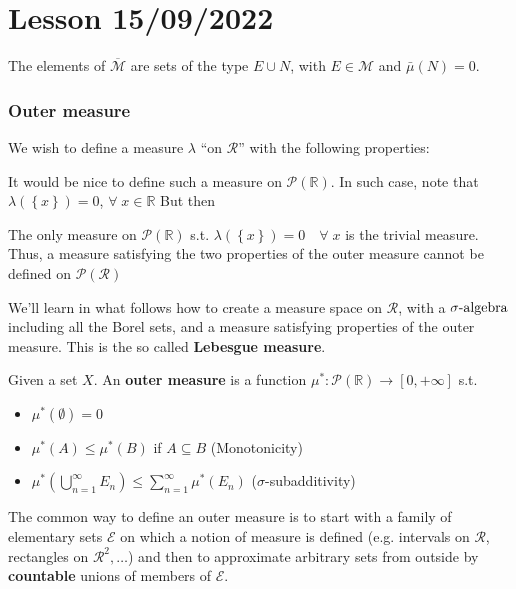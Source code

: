 \section{Lesson 15/09/2022}
The elements of \(\overline{\mathcal{M}}\) are sets of the type \(E \cup N\), with \(E \in \mathcal{M}\) and \(\bar{\mu}(N) = 0\).
\subsubsection*{Outer measure}
We wish to define a measure \(\lambda\) ``on \(\mathcal{R}\)'' with the following properties:
It would be nice to define such a measure on \(\mathcal{P}(\mathbb{R})\). In such case, note that \(\lambda(\left\lbrace x \right\rbrace) = 0\), \(\forall \; x \in \mathbb{R}\)
But then 
\begin{theorem}[Ulam]
    The only measure on \(\mathcal{P}(\mathbb{R})\) s.t. \(\lambda(\left\lbrace x \right\rbrace) = 0 \quad \forall \; x\) is the trivial measure. Thus, a measure satisfying the two properties of the outer measure cannot be defined on \(\mathcal{P}(\mathcal{R})\)
\end{theorem}
We'll learn in what follows how to create a measure space on \(\mathcal{R}\), with a \(\sigma\mbox{-algebra}\) including all the Borel sets, and a measure satisfying properties of the outer measure. This is the so called \textbf{Lebesgue measure}.
\begin{definition}
    Given a set \(X\). An \textbf{outer measure} is a function \(\mu^* : \mathcal{P}(\mathbb{R}) \to [0, +\infty]\) s.t. 
    \begin{itemize}
        \item \(\mu^*(\emptyset) = 0\)
        \item \(\mu^*(A) \leq \mu^*(B)\) if \(A \subseteq B\) (Monotonicity)
        \item \(\mu^*(\bigcup_{n=1}^{\infty} E_n) \leq \sum_{n=1}^{\infty} \mu^*(E_n)\) (\(\sigma\)-subadditivity)
    \end{itemize}
\end{definition}
The common way to define an outer measure is to start with a family of elementary sets \(\mathcal{E}\) on which a notion of measure is defined (e.g. intervals on \(\mathcal{R}\), rectangles on \(\mathcal{R}^2, \ldots\)) and then to approximate arbitrary sets from outside by \textbf{countable} unions of members of \(\mathcal{E}\).
